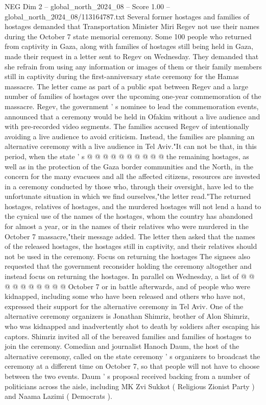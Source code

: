 \begin{textsample}{NEG Dim 2 – global\_north\_2024\_08 – Score 1.00 – global\_north\_2024\_08/113164787.txt}  \label{ex:f2_neg_358}
Several former hostages and families of hostages demanded that Transportation Minister Miri Regev not use their names during the October 7 state memorial ceremony.
Some 100 people who returned from captivity in Gaza, along with families of hostages still being held in Gaza, made their request in a letter sent to Regev on Wednesday.
They demanded that she refrain from using any information or images of them or their family members still in captivity during the first-anniversary state ceremony for the Hamas massacre.
The letter came as part of a public spat between Regev and a large number of families of hostages over the upcoming one-year commemoration of the massacre.
Regev, the government ' s nominee to lead the commemoration events, announced that a ceremony would be held in Ofakim without a live audience and with pre-recorded video segments.
The families accused Regev of intentionally avoiding a live audience to avoid criticism.
Instead, the families are planning an alternative ceremony with a live audience in Tel Aviv."It can not be that, in this period, when the state ' s @ @ @ @ @ @ @ @ @ @ the remaining hostages, as well as in the protection of the Gaza border communities and the North, in the concern for the many evacuees and all the affected citizens, resources are invested in a ceremony conducted by those who, through their oversight, have led to the unfortunate situation in which we find ourselves,"the letter read."The returned hostages, relatives of hostages, and the murdered hostages will not lend a hand to the cynical use of the names of the hostages, whom the country has abandoned for almost a year, or in the names of their relatives who were murdered in the October 7 massacre,"their message added.
The letter then asked that the names of the released hostages, the hostages still in captivity, and their relatives should not be used in the ceremony.
Focus on returning the hostages The signees also requested that the government reconsider holding the ceremony altogether and instead focus on returning the hostages.
In parallel on Wednesday, a list of @ @ @ @ @ @ @ @ @ @ October 7 or in battle afterwards, and of people who were kidnapped, including some who have been released and others who have not, expressed their support for the alternative ceremony in Tel Aviv.
One of the alternative ceremony organizers is Jonathan Shimriz, brother of Alon Shimriz, who was kidnapped and inadvertently shot to death by soldiers after escaping his captors.
Shimriz invited all of the bereaved families and families of hostages to join the ceremony.
Comedian and journalist Hanoch Daum, the host of the alternative ceremony, called on the state ceremony ' s organizers to broadcast the ceremony at a different time on October 7, so that people will not have to choose between the two events.
Daum ' s proposal received backing from a number of politicians across the aisle, including MK Zvi Sukkot ( Religious Zionist Party ) and Naama Lazimi ( Democrats ).

\end{textsample}
